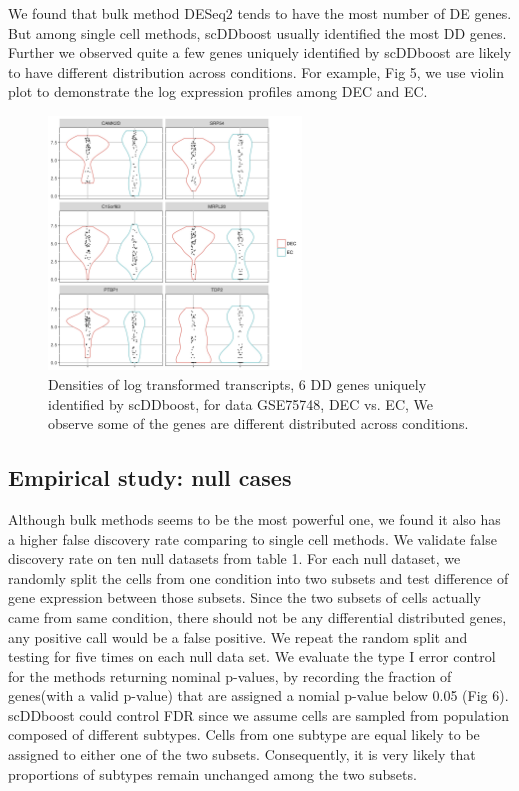 \documentclass[11pt]{amsart}
\begin{document}
We found that bulk method DESeq2 tends to have the most number of DE genes. But among single cell methods, scDDboost usually identified the most DD genes. Further we observed quite a few genes uniquely identified by scDDboost are likely to have different distribution across conditions. For example, Fig 5, we use violin plot to demonstrate the log expression profiles among DEC and EC. \\
\begin{figure}[H]
\includegraphics[width = 0.6\textwidth]{Figs/density_DEC_dd.png}
 \caption{ Densities of log transformed transcripts, 6 DD genes uniquely identified by scDDboost, for data GSE75748, DEC vs. EC, We observe some of the genes are different distributed across conditions.}
  \label{fig:6}
\end{figure}

\subsection{Empirical study: null cases}
Although bulk methods seems to be the most powerful one, we found it also has a higher false discovery rate comparing to single cell methods. We validate false discovery rate on ten null datasets from table 1. For each null dataset, we randomly split the cells from one condition into two subsets and test difference of gene expression between those subsets. Since the two subsets of cells actually came from same condition, there should not be any differential distributed genes, any positive call would be a false positive. We repeat the random split and testing for five times on each null data set. We evaluate the type I error control for the methods returning nominal p-values, by recording the fraction of genes(with a valid p-value) that are assigned a nomial p-value below 0.05 (Fig 6).\\
scDDboost could control FDR since we assume cells are sampled from population composed of different subtypes. Cells from one subtype are equal likely to be assigned to either one of the two subsets. Consequently, it is very likely that proportions of subtypes remain unchanged among the two subsets.
\end{document}
